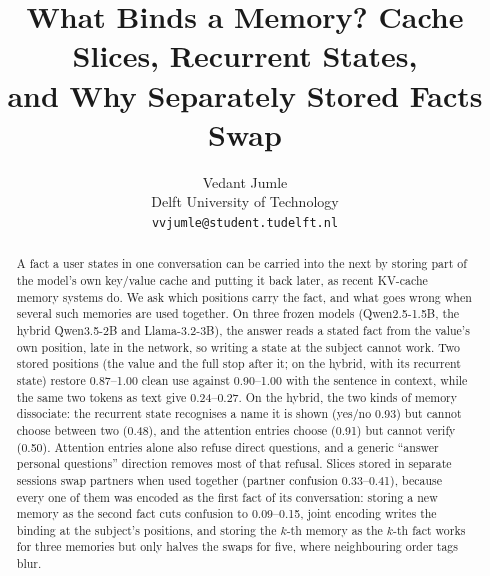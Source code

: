 \documentclass[11pt]{article}
\title{What Binds a Memory? Cache Slices, Recurrent States,\\and Why Separately Stored Facts Swap}
\author{Vedant Jumle \\
  Delft University of Technology \\
  \texttt{vvjumle@student.tudelft.nl}}
\begin{document}
\maketitle

\begin{abstract}
A fact a user states in one conversation can be carried into the next by storing part of the model's own key/value
cache and putting it back later, as recent KV-cache memory systems do. We ask which positions carry the fact, and
what goes wrong when several such memories are used together. On three frozen models (Qwen2.5-1.5B, the hybrid Qwen3.5-2B and Llama-3.2-3B), the answer reads a
stated fact from the value's own position, late in the network, so writing a state at the subject cannot work. Two
stored positions (the value and the full stop after it; on the hybrid, with its recurrent state) restore 0.87--1.00 clean use against 0.90--1.00 with the
sentence in context, while the same two tokens as text give 0.24--0.27. On the hybrid, the two kinds of memory
dissociate: the recurrent state recognises a name it is shown (yes/no 0.93) but cannot choose between two (0.48), and
the attention entries choose (0.91) but cannot verify (0.50). Attention entries alone also refuse direct questions,
and a generic ``answer personal questions'' direction removes most of that refusal. Slices stored in separate
sessions swap partners when used together (partner confusion 0.33--0.41), because every one of them was encoded as
the first fact of its conversation: storing a new memory as the second fact cuts confusion to 0.09--0.15, joint
encoding writes the binding at the subject's positions, and storing the $k$-th memory as the $k$-th fact works for
three memories but only halves the swaps for five, where neighbouring order tags blur.
\end{abstract}
\end{document}
